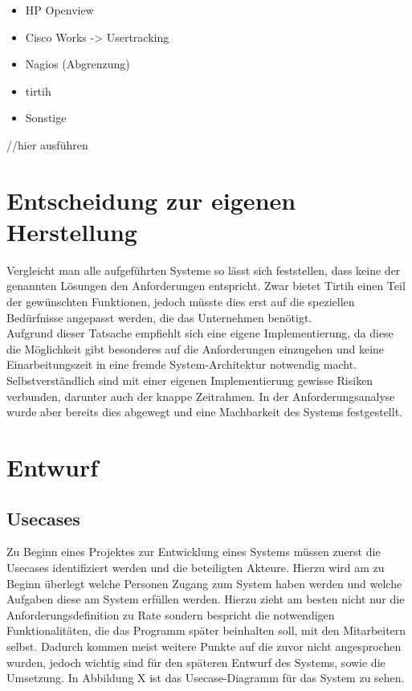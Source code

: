\begin{itemize}
\item HP Openview
\item Cisco Works -> Usertracking
\item Nagios (Abgrenzung)
\item tirtih
\item Sonstige
\end{itemize}

//hier ausführen

\section{Entscheidung zur eigenen Herstellung}
\label{sec:decisionowncreating}

Vergleicht man alle aufgeführten Systeme so lässt sich feststellen, dass keine der genannten Lösungen den Anforderungen entspricht.
Zwar bietet Tirtih einen Teil der gewünschten Funktionen, jedoch müsste dies erst auf die speziellen Bedürfnisse angepasst werden, die das Unternehmen benötigt.\\
Aufgrund dieser Tatsache empfiehlt sich eine eigene Implementierung, da diese die Möglichkeit gibt besonderes auf die Anforderungen einzugehen und keine Einarbeitungszeit in eine fremde System-Architektur notwendig macht.\\
Selbstverständlich sind mit einer eigenen Implementierung gewisse Risiken verbunden, darunter auch der knappe Zeitrahmen. In der Anforderungsanalyse wurde aber bereits dies abgewegt und eine Machbarkeit des Systems festgestellt.\\



\section{Entwurf}
\label{sec:Entwurf}


\subsection{Usecases}
\label{subsec:usecases}

Zu Beginn eines Projektes zur Entwicklung eines Systems müssen zuerst die Usecases identifiziert werden und die beteiligten Akteure.
Hierzu wird am zu Beginn überlegt welche Personen Zugang zum System haben werden und welche Aufgaben diese am System erfüllen werden. Hierzu zieht am besten nicht nur die Anforderungsdefinition zu Rate sondern bespricht die notwendigen Funktionalitäten, die das Programm später beinhalten soll, mit den Mitarbeitern selbst. Dadurch kommen meist weitere Punkte auf die zuvor nicht angesprochen wurden, jedoch wichtig sind für den späteren Entwurf des Systems, sowie die Umsetzung.
In Abbildung X ist das Usecase-Diagramm für das System zu sehen.

